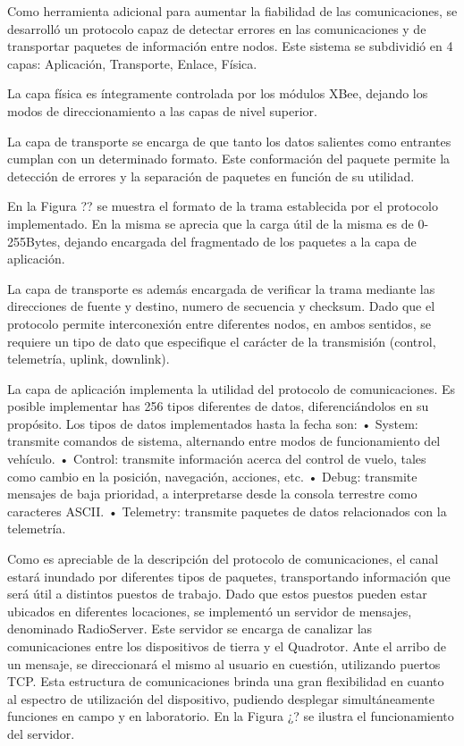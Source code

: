 \documentclass[conference]{IEEEtran}
\begin{document}
Como herramienta adicional para aumentar la fiabilidad de las comunicaciones, se desarrolló un protocolo capaz de detectar errores en las comunicaciones y de transportar paquetes de información entre nodos. Este sistema se subdividió en 4 capas: Aplicación, Transporte, Enlace, Física.

La capa física es íntegramente controlada por los módulos XBee, dejando los modos de direccionamiento a las capas de nivel superior.

La capa de transporte se encarga de que tanto los datos salientes como entrantes cumplan con un determinado formato. Este conformación del paquete permite la detección de errores y la separación de paquetes en función de su utilidad.

En la Figura ?? se muestra el formato de la trama establecida por el protocolo implementado. En la misma se aprecia que la carga útil de la misma es de 0-255Bytes, dejando encargada del fragmentado de los paquetes a la capa de aplicación.
 
La capa de transporte es además encargada de verificar la trama mediante las direcciones de fuente y destino, numero de secuencia y checksum. Dado que el protocolo permite interconexión entre diferentes nodos, en ambos sentidos, se requiere un tipo de dato que especifique el carácter de la transmisión (control, telemetría, uplink, downlink).

La capa de aplicación implementa la utilidad del protocolo de comunicaciones. Es posible implementar has 256 tipos diferentes de datos, diferenciándolos en su propósito. Los tipos de datos implementados hasta la fecha son:
•	System: transmite comandos de sistema, alternando entre modos de funcionamiento del vehículo.
•	Control: transmite información acerca del control de vuelo, tales como cambio en la posición, navegación, acciones, etc.
•	Debug: transmite mensajes de baja prioridad, a interpretarse desde la consola terrestre como caracteres ASCII.
•	Telemetry: transmite paquetes de datos relacionados con la telemetría.

Como es apreciable de la descripción del protocolo de comunicaciones, el canal estará inundado por diferentes tipos de paquetes, transportando información que será útil a distintos puestos de trabajo. Dado que estos puestos pueden estar ubicados en diferentes locaciones, se implementó un servidor de mensajes, denominado RadioServer. Este servidor se encarga de canalizar las comunicaciones entre los dispositivos de tierra y el Quadrotor. Ante el arribo de un mensaje, se direccionará el mismo al usuario en cuestión, utilizando puertos TCP. Esta estructura de comunicaciones brinda una gran flexibilidad en cuanto al espectro de utilización del dispositivo, pudiendo desplegar simultáneamente funciones en campo y en laboratorio.
En la Figura ¿? se ilustra el funcionamiento del servidor.
 
\end{document}
